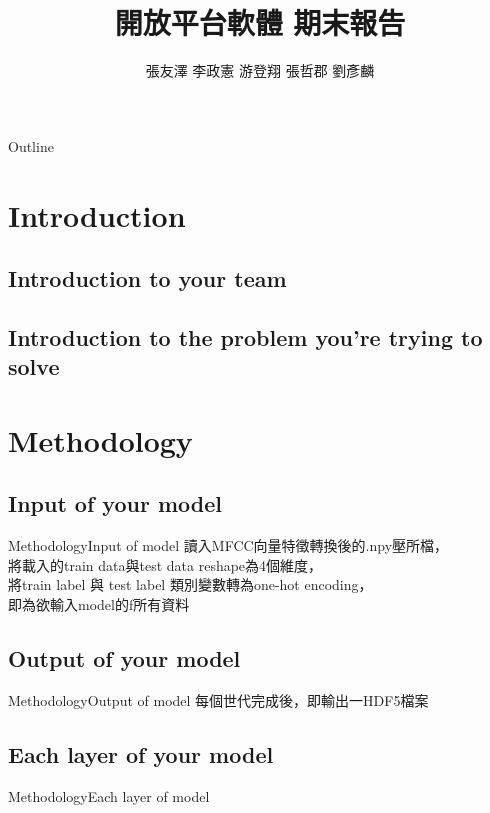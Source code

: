 \documentclass{beamer}
\begin{document}
\begin{CJK}{UTF8}{nkai}
\title{開放平台軟體 期末報告}
\author{張友澤  李政憲  游登翔  張哲郡  劉彥麟 }

\begin{frame}
  \titlepage
\end{frame}

\begin{frame}[shrink]{Outline} 
\tableofcontents 
\end{frame}

\section{ Introduction}
\subsection{Introduction to your team}
\subsection{Introduction to the problem you're trying to solve}

\section{Methodology}
\subsection{Input of your model}
\begin{frame}{Methodology}{Input of  model}
	讀入MFCC向量特徵轉換後的.npy壓所檔，\\
	將載入的train data與test data reshape為4個維度，\\
	將train label 與 test label 類別變數轉為one-hot encoding，\\
	即為欲輸入model的f所有資料
 \end{frame}

\subsection{Output of your model}
\begin{frame}{Methodology}{Output of  model}
	每個世代完成後，即輸出一HDF5檔案
\end{frame}

\subsection{Each layer of your model}
\begin{frame}{Methodology}{Each layer of model}


\end{frame}
\end{CJK}
\end{document}
